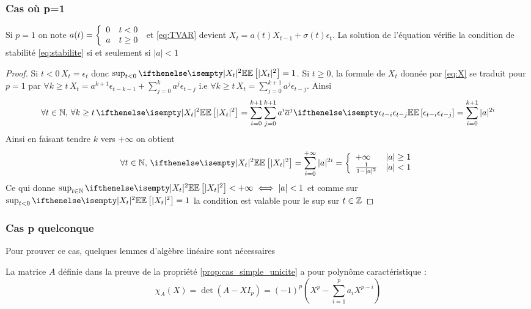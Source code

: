 \documentclass[a4paper,french]{article}
\begin{document}
\subsubsection{Cas où p=1}
\begin{Prop}
Si $p=1$ on note $a(t)= { \left\lbrace \begin{array}{ll} 
0 & t<0 \\
a & t \geq 0 \\ \end{array} \right. } $ et \eqref{eq:TVAR} devient $X_t = a(t)X_{t-1} + \sigma(t) \epsilon_t$. La solution de l'équation vérifie la condition de stabilité \eqref{eq:stabilite} si et seulement si $|a| < 1$
\end{Prop}
\begin{proof}
Si $t < 0\, X_t = \epsilon_t$ donc $\sup_{t < 0} \EE[|X_t|^2] = 1$. Si $t\geq 0$, la formule de $X_t$ donnée par \eqref{eq:X} se traduit pour $p=1$ par
$ \forall k \geq t \,  X_t = a^{k+1}\epsilon_{t-k-1} + \sum_{j=0}^k a^j \epsilon_{t-j} $ i.e $\forall k \geq t \, X_t = \sum_{j=0}^{k+1} a^j\epsilon_{t-j}$.
Ainsi 
\[ \forall t \in \nset, \, \forall k \geq t \, \EE[|X_t|^2] = \sum_{i=0}^{k+1} \sum_{j=0}^{k+1} a^i \overline{a}^j \EE[\epsilon_{t-i} \epsilon_{t-j}]= \sum_{i=0}^{k+1} |a|^{2i} \]
Ainsi en faisant tendre $k$ vers $+\infty$ on obtient 
 \[ \forall t \in \nset, \, \EE[|X_t|^2] = \sum_{i=0}^{+\infty} |a|^{2i} = \piecewise{
+\infty & |a|\geq 1 \\
\frac{1}{1-|a|^2} & |a| < 1} \]
Ce qui donne $\sup_{t\in \nset} \EE[|X_t|^2] < +\infty \iff |a| < 1$ et comme sur $\sup_{t < 0} \EE[|X_t|^2] = 1$ la condition est valable pour le sup sur $t\in \mathbb{Z}$
\end{proof}

\subsubsection{Cas p quelconque}
Pour prouver ce cas, quelques lemmes d'algèbre linéaire sont nécessaires
\begin{Lem}
La matrice $A$ définie dans la preuve de la propriété \ref{prop:cas_simple_unicite} a pour polynôme caractéristique : 
\[
\chi_A (X)= \det(A-XI_p) = (-1)^p \left( X^p - \sum_{i=1}^p a_i X^{p-i} \right)
\]
\end{Lem}
\end{document}
